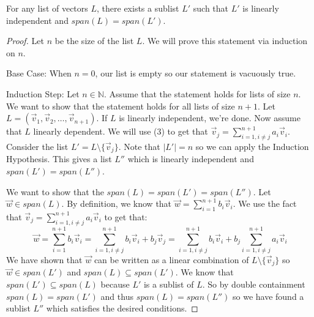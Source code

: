 \begin{theorem}
    For any list of vectors $L$, there exists a sublist $L'$ such that $L'$ is linearly independent and $span(L)=span(L')$.
\end{theorem}
\begin{proof}
    Let $n$ be the size of the list $L$. We will prove this statement via induction on $n$.

    Base Case: When $n=0$, our list is empty so our statement is vacuously true.

    Induction Step: Let $n\in\mathbb{N}$. Assume that the statement holds for lists of size $n$. We want to show that the statement holds for all lists of size $n+1$. Let $L=(\vec{v}_1,\vec{v}_2,\ldots,\vec{v}_{n+1})$. If $L$ is linearly independent, we're done. Now assume that $L$ linearly dependent. We will use (3) to get that $\vec{v}_j=\sum_{i=1,i\neq j}^{n+1}a_i\vec{v}_i$. Consider the list $L'=L\setminus\{\vec{v}_j\}$. Note that $|L'|=n$ so we can apply the Induction Hypothesis. This gives a list $L''$ which is linearly independent and $span(L')=span(L'')$.

    We want to show that the $span(L)=span(L')=span(L'')$. Let $\vec{w}\in span(L)$. By definition, we know that $\vec{w}=\sum_{i=1}^{n+1} b_i\vec{v}_i$. We use the fact that $\vec{v}_j=\sum_{i=1,i\neq j}^{n+1}a_i\vec{v}_i$ to get that: $$\vec{w}=\sum_{i=1}^{n+1} b_i\vec{v}_i=\sum_{i=1, i\neq j}^{n+1} b_i\vec{v}_i+b_j\vec{v}_j=\sum_{i=1, i\neq j}^{n+1} b_i\vec{v}_i+b_j\sum_{i=1,i\neq j}^{n+1}a_i\vec{v}_i$$
    We have shown that $\vec{w}$ can be written as a linear combination of $L\setminus\{\vec{v}_j\}$ so $\vec{w}\in span(L')$ and $span(L)\subseteq span(L')$. We know that $span(L')\subseteq span(L)$ because $L'$ is a sublist of $L$. So by double containment $span(L)=span(L')$ and thus $span(L)=span(L'')$ so we have found a sublist $L''$ which satisfies the desired conditions.
\end{proof}
